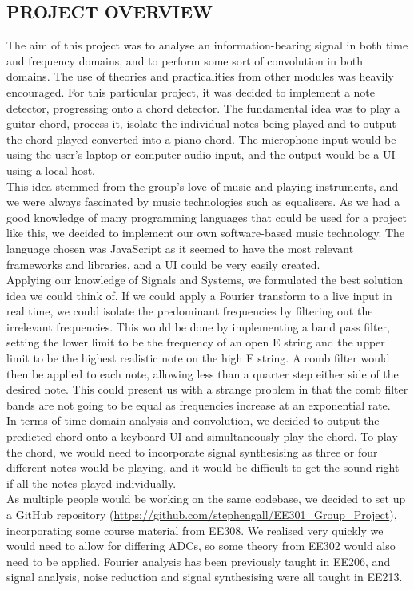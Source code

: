\documentclass[12pt,a4paper]{article}
\begin{document}
\subsection{PROJECT OVERVIEW}
The aim of this project was to analyse an information-bearing signal in both time and frequency domains, and to perform some sort of convolution in both domains. The use of theories and practicalities from other modules was heavily encouraged. For this particular project, it was decided to implement a note detector, progressing onto a chord detector. The fundamental idea was to play a guitar chord, process it, isolate the individual notes being played and to output the chord played converted into a piano chord. The microphone input would be using the user’s laptop or computer audio input, and the output would be a UI using a local host.\\
This idea stemmed from the group’s love of music and playing instruments, and we were always fascinated by music technologies such as equalisers. As we had a good knowledge of many programming languages that could be used for a project like this, we decided to implement our own software-based music technology. The language chosen was JavaScript as it seemed to have the most relevant frameworks and libraries, and a UI could be very easily created.\\
Applying our knowledge of Signals and Systems, we formulated the best solution idea we could think of. If we could apply a Fourier transform to a live input in real time, we could isolate the predominant frequencies by filtering out the irrelevant frequencies. This would be done by implementing a band pass filter, setting the lower limit to be the frequency of an open E string and the upper limit to be the highest realistic note on the high E string. A comb filter would then be applied to each note, allowing less than a quarter step either side of the desired note. This could present us with a strange problem in that the comb filter bands are not going to be equal as frequencies increase at an exponential rate.\\
In terms of time domain analysis and convolution, we decided to output the predicted chord onto a keyboard UI and simultaneously play the chord. To play the chord, we would need to incorporate signal synthesising as three or four different notes would be playing, and it would be difficult to get the sound right if all the notes played individually.\\
As multiple people would be working on the same codebase, we decided to set up a GitHub repository (\url{https://github.com/stephengall/EE301_Group_Project}), incorporating some course material from EE308. We realised very quickly we would need to allow for differing ADCs, so some theory from EE302 would also need to be applied. Fourier analysis has been previously taught in EE206, and signal analysis, noise reduction and signal synthesising were all taught in EE213.\\
\newpage
\end{document}
